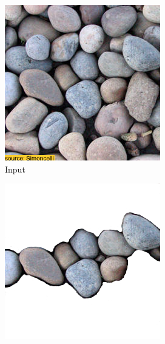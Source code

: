 \begin{figure}[]
    \centering    
    \begin{subfigure}{\textwidth}
        \centering
        \begin{subfigure}{0.24\textwidth}
            \centering
            \includegraphics[width=\textwidth]{images/04-experiment01/pebbles/target.jpg}
            \caption{Input}
            \label{fig:ex01-pebbles-1000steps-some_target}
        \end{subfigure}
        \hfill
        \begin{subfigure}{0.24\textwidth}
            \centering
            \includegraphics[width=\textwidth]{images/04-experiment01/pebbles/some_bg.jpg}

\end{subfigure}
\end{subfigure}
\end{figure}
